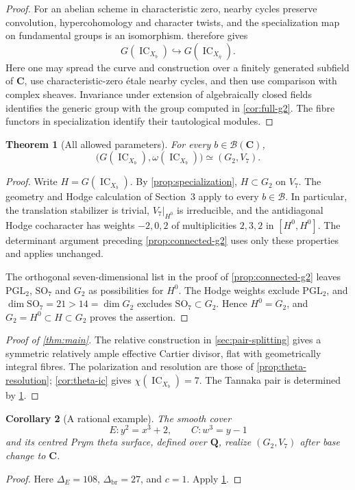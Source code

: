 \documentclass[10pt]{amsart}
\numberwithin{equation}{section}
\newtheorem{theorem}{Theorem}[section]
\newtheorem{corollary}[theorem]{Corollary}
\theoremstyle{definition}
\theoremstyle{remark}
\newcommand{\CC}{\mathbf C}
\newcommand{\QQ}{\mathbf Q}
\newcommand{\IC}{\operatorname{IC}}
\newcommand{\cB}{\mathcal B}
\begin{document}
\begin{proof}
For an abelian scheme in characteristic zero, nearby cycles preserve
convolution, hypercohomology and character twists, and the specialization
map on fundamental groups is an isomorphism.
\cite[Lemma~14.1 and Section~14]{KraemerWeissauer2015} therefore gives
\[
 G(\IC_{X_b})\hookrightarrow G(\IC_{X_{\bar\eta}}).
\]
Here one may spread the curve and construction over a finitely generated
subfield of $\CC$, use characteristic-zero \'etale nearby cycles, and
then use comparison with complex sheaves.  Invariance under extension of
algebraically closed fields
\cite[Corollary~4.4]{JKLM2025} identifies the generic group with the
group computed in \cref{cor:full-g2}.  The fibre functors in specialization
identify their tautological modules.
\end{proof}

\begin{theorem}[All allowed parameters]\label{thm:all-parameters}
For every $b\in\cB(\CC)$,
\[
 \bigl(G(\IC_{X_b}),\omega(\IC_{X_b})\bigr)\simeq(G_2,V_7).
\]
\end{theorem}
\begin{proof}
Write $H=G(\IC_{X_b})$.  By \cref{prop:specialization}, $H\subset G_2$
on $V_7$.  The geometry and Hodge calculation of Section~3 apply to
every $b\in\cB$.  In particular, the translation stabilizer is trivial,
$V_7|_{H^0}$ is irreducible, and the antidiagonal Hodge cocharacter has
weights $-2,0,2$ of multiplicities $2,3,2$ in $[H^0,H^0]$.
The determinant argument preceding \cref{prop:connected-g2} uses only
these properties and applies unchanged.

The orthogonal seven-dimensional list in the proof of
\cref{prop:connected-g2} leaves $\mathrm{PGL}_2$, $\mathrm{SO}_7$ and
$G_2$ as possibilities for $H^0$.  The Hodge weights exclude
$\mathrm{PGL}_2$, and $\dim\mathrm{SO}_7=21>14=\dim G_2$ excludes
$\mathrm{SO}_7\subset G_2$.  Hence $H^0=G_2$, and
$G_2=H^0\subset H\subset G_2$ proves the assertion.
\end{proof}

\begin{proof}[Proof of \cref{thm:main}]
The relative construction in \cref{sec:pair-splitting} gives a symmetric
relatively ample effective Cartier divisor, flat with geometrically
integral fibres.  The polarization and resolution are those of
\cref{prop:theta-resolution}; \cref{cor:theta-ic} gives
$\chi(\IC_{X_b})=7$.  The Tannaka pair is determined by
\cref{thm:all-parameters}.
\end{proof}

\begin{corollary}[A rational example]
The smooth cover
\[
 E:y^2=x^3+2,\qquad C:w^3=y-1
\]
and its centred Prym theta surface, defined over $\QQ$, realize
$(G_2,V_7)$ after base change to $\CC$.
\end{corollary}
\begin{proof}
Here $\Delta_E=108$, $\Delta_{\mathrm{br}}=27$, and $c=1$.
Apply \cref{thm:all-parameters}.
\end{proof}
\end{document}
